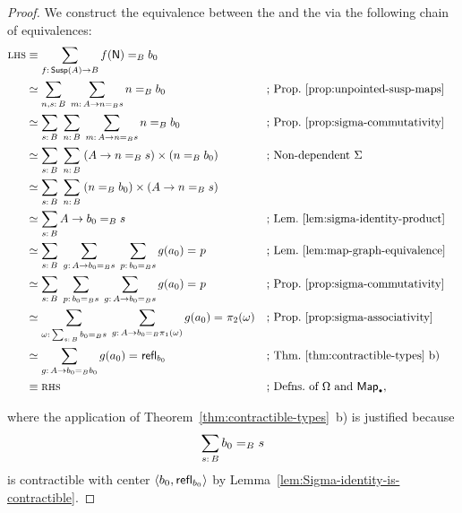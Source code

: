 \begin{proof}
    We construct the equivalence between the \lhs and the \rhs via the following chain of equivalences:
    {\small\begin{align*}
        \lhs
            &\equiv\sum_{f\colon\fun{Susp}(A)\to B} f(\fun N)\eq{B}b_0\\
            &\simeq
                \sum_{n,s\colon B}\;
                \sum_{m\colon A\to n\eq{B}s}
                    n\eq{B}b_0
                    &&\text{; Prop.~\ref{prop:unpointed-susp-maps}}\\
            &\simeq
                \sum_{s\colon B}\;
                \sum_{n\colon B}\;
                \sum_{m\colon A\to n\eq{B}s}
                    n\eq{B}b_0
                &&\text{; Prop.~\ref{prop:sigma-commutativity}}\\
            &\simeq
                \sum_{s\colon B}\;
                \sum_{n\colon B}\;
                (A\to n\eq{B}s)\times(n\eq{B}b_0)
                &&\text{; Non-dependent $\Sigma$}\\
            &\simeq
                \sum_{s\colon B}\;
                \sum_{n\colon B}\;
                (n\eq{B}b_0)\times(A\to n\eq{B}s)\\
            &\simeq\sum_{s\colon B}A\to b_0\eq{B}s
                &&\text{; Lem.~\ref{lem:sigma-identity-product}}\\
            &\simeq
                \sum_{s\colon B}\;
                \sum_{g\colon A\to b_0\eq Bs}\;
                \sum_{p\colon b_0\eq Bs}
                    g(a_0)\eq{}p
                &&\text{; Lem.~\ref{lem:map-graph-equivalence}}\\
            &\simeq
                \sum_{s\colon B}\;
                \sum_{p\colon b_0\eq{B}s}\;
                \sum_{g\colon A\to b_0\eq{B}s}
                    g(a_0)\eq{}p
                &&\text{; Prop.~\ref{prop:sigma-commutativity}}\\
            &\simeq
                \sum_{
                    \omega\colon\sum_{s\colon B}b_0\eq{B}s
                }\;
                \sum_{
                    g\colon A\to b_0\eq{B}\pi_1(\omega)
                }
                    g(a_0)\eq{}\pi_2(\omega)
                &&\text{; Prop.~\ref{prop:sigma-associativity}}\\
             &\simeq
                \sum_{g\colon A\to b_0\eq{B}b_0}
                    g(a_0)\eq{}\fun{refl}_{b_0}
                &&\text{; Thm.~\ref{thm:contractible-types}~b)}\\
            &\equiv\rhs
                &&\text{; Defns.\ of $\Omega$ and $\fun{Map}_\sbull$},
    \end{align*}}
    
    where the application of Theorem~\ref{thm:contractible-types}~b) is justified because
    \[
        \sum_{s\colon B}b_0\eq{B}s
    \]
    is contractible with center $\langle b_0,\mathsf{refl}_{b_0}\rangle$ by Lemma~\ref{lem:Sigma-identity-is-contractible}.
\end{proof}

